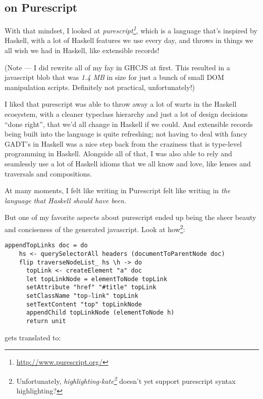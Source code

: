\documentclass[]{article}
\renewcommand{\href}[2]{#2\footnote{\url{#1}}}
\begin{document}
\subsection{on Purescript}\label{on-purescript}

With that mindset, I looked at
\emph{\href{http://www.purescript.org/}{purescript}}, which is a language that's
inspired by Haskell, with a lot of Haskell features we use every day, and throws
in things we all wish we had in Haskell, like extensible records!

(Note --- I did rewrite all of my fay in GHCJS at first. This resulted in a
javascript blob that was \emph{1.4 MB} in size for just a bunch of small DOM
manipulation scripts. Definitely not practical, unfortunately!)

I liked that purescript was able to throw away a lot of warts in the Haskell
ecosystem, with a cleaner typeclass hierarchy and just a lot of design decisions
``done right'', that we'd all change in Haskell if we could. And extensible
records being built into the language is quite refreshing; not having to deal
with fancy GADT's in Haskell was a nice step back from the craziness that is
type-level programming in Haskell. Alongside all of that, I was also able to
rely and seamlessly use a lot of Haskell idioms that we all know and love, like
lenses and traversals and compositions.

At many moments, I felt like writing in Purescript felt like writing in
\emph{the language that Haskell should have been}.

But one of my favorite aspects about purescript ended up being the sheer beauty
and conciseness of the generated javascript. Look at how\footnote{Unfortunately,
  \emph{\href{https://github.com/jgm/highlighting-kate}{highlighting-kate}}
  doesn't yet support purescript syntax highlighting?}:

\begin{verbatim}
appendTopLinks doc = do
    hs <- querySelectorAll headers (documentToParentNode doc)
    flip traverseNodeList_ hs \h -> do
      topLink <- createElement "a" doc
      let topLinkNode = elementToNode topLink
      setAttribute "href" "#title" topLink
      setClassName "top-link" topLink
      setTextContent "top" topLinkNode
      appendChild topLinkNode (elementToNode h)
      return unit
\end{verbatim}

gets translated to:
\end{document}
